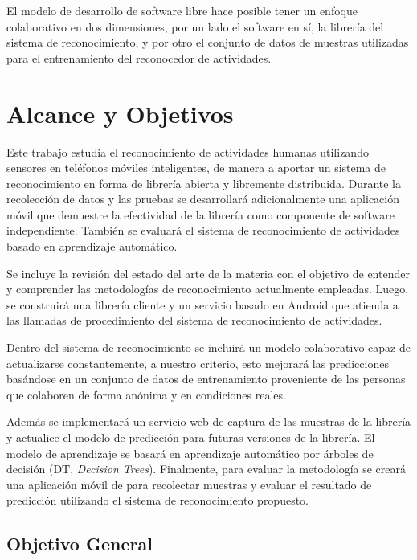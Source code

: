 El modelo de desarrollo de software libre hace posible tener un enfoque
colaborativo en dos dimensiones, por un lado el software en sí, la
librería del sistema de reconocimiento, y por otro el conjunto de
datos de muestras utilizadas para el entrenamiento del reconocedor
de actividades.

\section{Alcance y Objetivos}

\label{alcance-y-objetivos}

Este trabajo estudia el reconocimiento de actividades humanas utilizando
sensores en teléfonos móviles inteligentes, de manera a aportar un
sistema de reconocimiento en forma de librería abierta y libremente
distribuida. Durante la recolección de datos y las pruebas se desarrollará
adicionalmente una aplicación móvil que demuestre la efectividad de
la librería como componente de software independiente. También se
evaluará el sistema de reconocimiento de actividades basado en aprendizaje
automático.

Se incluye la revisión del estado del arte de la materia con el objetivo
de entender y comprender las metodologías de reconocimiento actualmente
empleadas. Luego, se construirá una librería cliente y un servicio
basado en Android que atienda a las llamadas de procedimiento del
sistema de reconocimiento de actividades. 

Dentro del sistema de reconocimiento se incluirá un modelo colaborativo
capaz de actualizarse constantemente, a nuestro criterio, esto mejorará
las predicciones basándose en un conjunto de datos de entrenamiento
proveniente de las personas que colaboren de forma anónima y en condiciones
reales.

Además se implementará un servicio web de captura de las muestras
de la librería y actualice el modelo de predicción para futuras versiones
de la librería. El modelo de aprendizaje se basará en aprendizaje
automático por árboles de decisión (DT,
\emph{Decision Trees}). Finalmente, para evaluar la metodología se
creará una aplicación móvil de para recolectar muestras y evaluar
el resultado de predicción utilizando el sistema de reconocimiento
propuesto.

\subsection{Objetivo General}

